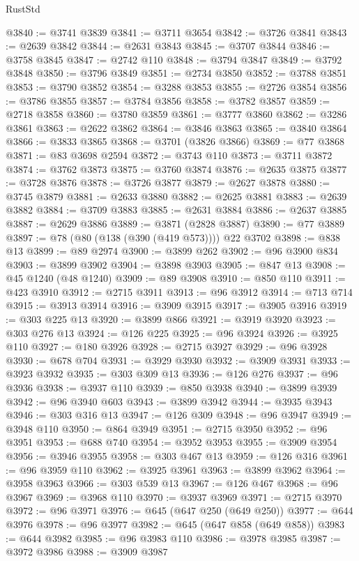 \begin{lexlean}{RustStd}
\begin{coremodule}
{\begin{coremodule}
{{{{{{{{{{{{{{{{{{{{{{{{{{{{{{{{{{{{{{{{{{{{{{{{{{{{{{{{{{{{@3840 := @3741 @3839
@3841 := @3711 @3654
@3842 := @3726 @3841
@3843 := @2639 @3842
@3844 := @2631 @3843
@3845 := @3707 @3844
@3846 := @3758 @3845
@3847 := @2742 @110
@3848 := @3794 @3847
@3849 := @3792 @3848
@3850 := @3796 @3849
@3851 := @2734 @3850
@3852 := @3788 @3851
@3853 := @3790 @3852
@3854 := @3288 @3853
@3855 := @2726 @3854
@3856 := @3786 @3855
@3857 := @3784 @3856
@3858 := @3782 @3857
@3859 := @2718 @3858
@3860 := @3780 @3859
@3861 := @3777 @3860
@3862 := @3286 @3861
@3863 := @2622 @3862
@3864 := @3846 @3863
@3865 := @3840 @3864
@3866 := @3833 @3865
@3868 := @3701 (@3826 @3866)
@3869 := @77 @3868
@3871 := @83 @3698 @2594
@3872 := @3743 @110
@3873 := @3711 @3872
@3874 := @3762 @3873
@3875 := @3760 @3874
@3876 := @2635 @3875
@3877 := @3728 @3876
@3878 := @3726 @3877
@3879 := @2627 @3878
@3880 := @3745 @3879
@3881 := @2633 @3880
@3882 := @2625 @3881
@3883 := @2639 @3882
@3884 := @3709 @3883
@3885 := @2631 @3884
@3886 := @2637 @3885
@3887 := @2629 @3886
@3889 := @3871 (@2828 @3887)
@3890 := @77 @3889
@3897 := @78 (@80 (@138 (@390 (@419 @573)))) @22 @3702
@3898 := @838 @13
@3899 := @89 @2974
@3900 := @3899 @262
@3902 := @96 @3900 @834
@3903 := @3899 @3902
@3904 := @3898 @3903
@3905 := @847 @13
@3908 := @45 @1240 (@48 @1240)
@3909 := @89 @3908
@3910 := @850 @110
@3911 := @423 @3910
@3912 := @2715 @3911
@3913 := @96 @3912
@3914 := @713 @714
@3915 := @3913 @3914
@3916 := @3909 @3915
@3917 := @3905 @3916
@3919 := @303 @225 @13
@3920 := @3899 @866
@3921 := @3919 @3920
@3923 := @303 @276 @13
@3924 := @126 @225
@3925 := @96 @3924
@3926 := @3925 @110
@3927 := @180 @3926
@3928 := @2715 @3927
@3929 := @96 @3928
@3930 := @678 @704
@3931 := @3929 @3930
@3932 := @3909 @3931
@3933 := @3923 @3932
@3935 := @303 @309 @13
@3936 := @126 @276
@3937 := @96 @3936
@3938 := @3937 @110
@3939 := @850 @3938
@3940 := @3899 @3939
@3942 := @96 @3940 @603
@3943 := @3899 @3942
@3944 := @3935 @3943
@3946 := @303 @316 @13
@3947 := @126 @309
@3948 := @96 @3947
@3949 := @3948 @110
@3950 := @864 @3949
@3951 := @2715 @3950
@3952 := @96 @3951
@3953 := @688 @740
@3954 := @3952 @3953
@3955 := @3909 @3954
@3956 := @3946 @3955
@3958 := @303 @467 @13
@3959 := @126 @316
@3961 := @96 @3959 @110
@3962 := @3925 @3961
@3963 := @3899 @3962
@3964 := @3958 @3963
@3966 := @303 @539 @13
@3967 := @126 @467
@3968 := @96 @3967
@3969 := @3968 @110
@3970 := @3937 @3969
@3971 := @2715 @3970
@3972 := @96 @3971
@3976 := @645 (@647 @250 (@649 @250))
@3977 := @644 @3976
@3978 := @96 @3977
@3982 := @645 (@647 @858 (@649 @858))
@3983 := @644 @3982
@3985 := @96 @3983 @110
@3986 := @3978 @3985
@3987 := @3972 @3986
@3988 := @3909 @3987
}}}}}}}}}}}}}}}}}}}}}}}}}}}}}}}}}}}}}}}}}}}}}}}}}}}}}}}}}}}}
\end{coremodule}}
\end{coremodule}
\end{lexlean}
